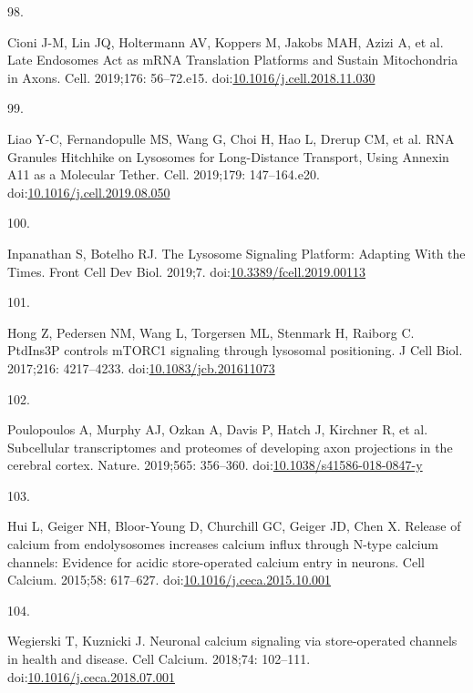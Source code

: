 \documentclass[
  12pt,
  a4paper,
]{book}
\newlength{\cslhangindent}
\newlength{\csllabelwidth}
\newenvironment{CSLReferences}[2] %
 {\begin{list}{}{%
  \setlength{\itemindent}{0pt}
  \setlength{\leftmargin}{0pt}
  \setlength{\parsep}{0pt}
  \ifodd #1
   \setlength{\leftmargin}{\cslhangindent}
   \setlength{\itemindent}{-1\cslhangindent}
  \fi
  \setlength{\itemsep}{#2\baselineskip}}}
 {\end{list}}
\newcommand{\CSLLeftMargin}[1]{\parbox[t]{\csllabelwidth}{\strut#1\strut}}
\newcommand{\CSLRightInline}[1]{\parbox[t]{\linewidth - \csllabelwidth}{\strut#1\strut}}
\begin{document}
\begin{CSLReferences}{0}{1}
\CSLLeftMargin{98. }%
\CSLRightInline{Cioni J-M, Lin JQ, Holtermann AV, Koppers M, Jakobs MAH, Azizi A, et al. Late {Endosomes Act} as {mRNA Translation Platforms} and {Sustain Mitochondria} in {Axons}. Cell. 2019;176: 56--72.e15. doi:\href{https://doi.org/10.1016/j.cell.2018.11.030}{10.1016/j.cell.2018.11.030}}

\CSLLeftMargin{99. }%
\CSLRightInline{Liao Y-C, Fernandopulle MS, Wang G, Choi H, Hao L, Drerup CM, et al. {RNA Granules Hitchhike} on {Lysosomes} for {Long-Distance Transport}, {Using Annexin A11} as a {Molecular Tether}. Cell. 2019;179: 147--164.e20. doi:\href{https://doi.org/10.1016/j.cell.2019.08.050}{10.1016/j.cell.2019.08.050}}

\CSLLeftMargin{100. }%
\CSLRightInline{Inpanathan S, Botelho RJ. The {Lysosome Signaling Platform}: {Adapting With} the {Times}. Front Cell Dev Biol. 2019;7. doi:\href{https://doi.org/10.3389/fcell.2019.00113}{10.3389/fcell.2019.00113}}

\CSLLeftMargin{101. }%
\CSLRightInline{Hong Z, Pedersen NM, Wang L, Torgersen ML, Stenmark H, Raiborg C. {PtdIns3P} controls {mTORC1} signaling through lysosomal positioning. J Cell Biol. 2017;216: 4217--4233. doi:\href{https://doi.org/10.1083/jcb.201611073}{10.1083/jcb.201611073}}

\CSLLeftMargin{102. }%
\CSLRightInline{Poulopoulos A, Murphy AJ, Ozkan A, Davis P, Hatch J, Kirchner R, et al. Subcellular transcriptomes and proteomes of developing axon projections in the cerebral cortex. Nature. 2019;565: 356--360. doi:\href{https://doi.org/10.1038/s41586-018-0847-y}{10.1038/s41586-018-0847-y}}

\CSLLeftMargin{103. }%
\CSLRightInline{Hui L, Geiger NH, Bloor-Young D, Churchill GC, Geiger JD, Chen X. Release of calcium from endolysosomes increases calcium influx through {N-type} calcium channels: {Evidence} for acidic store-operated calcium entry in neurons. Cell Calcium. 2015;58: 617--627. doi:\href{https://doi.org/10.1016/j.ceca.2015.10.001}{10.1016/j.ceca.2015.10.001}}

\CSLLeftMargin{104. }%
\CSLRightInline{Wegierski T, Kuznicki J. Neuronal calcium signaling via store-operated channels in health and disease. Cell Calcium. 2018;74: 102--111. doi:\href{https://doi.org/10.1016/j.ceca.2018.07.001}{10.1016/j.ceca.2018.07.001}}


\end{CSLReferences}
\end{document}
